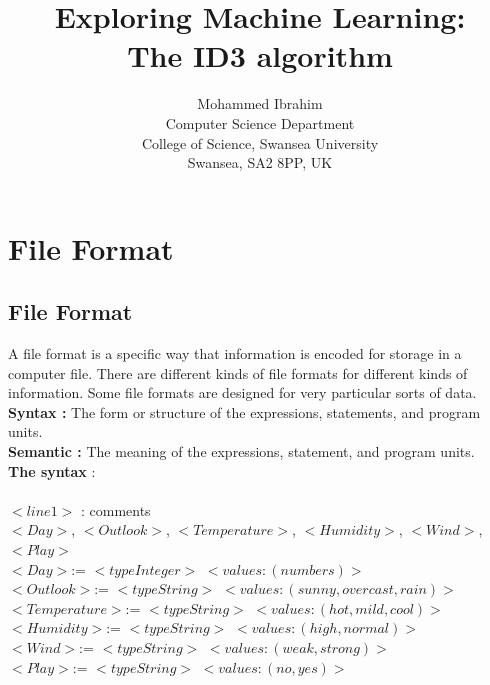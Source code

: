 \documentclass{report}
\begin{document}
\title{Exploring Machine Learning:\\
  The ID3 algorithm}

\author{Mohammed Ibrahim\\
 Computer Science Department\\
  College of Science, Swansea University\\
  Swansea, SA2 8PP, UK
}

\maketitle

\tableofcontents

\chapter{File Format}
\label{sec:fileformat}

\section{File Format}
\label{sec:file}

A file format is a specific way that information is encoded for storage in a computer file. There are different kinds of file formats for different kinds of information. Some file formats are designed for very particular sorts of data.\\
{\bf Syntax :} The form or structure of the expressions, statements, and program units.\\
{\bf Semantic :} The meaning of the expressions, statement, and program units. 	\\

{\bf The syntax} :\\\\
$<line 1>$ : comments\\
$<Day>$, $<Outlook>$, $<Temperature>$, $<Humidity>$, $<Wind>$, $<Play>$\\
$<Day>$:= $<type Integer >$ $<values : (numbers)>$\\
$<Outlook>$:= $< type String >$  $<values : (sunny, overcast, rain)>$\\
$<Temperature>$:= $< type String >$  $<values : (hot, mild, cool)>$\\
$<Humidity>$:= $< type String >$  $<values : (high, normal )>$\\
$<Wind>$:= $< type String >$  $<values : (weak, strong)>$\\
$<Play>$:= $< type String >$  $<values : (no,yes)>$\\
\end{document}
